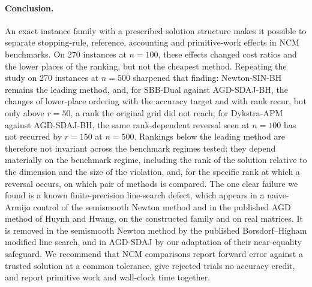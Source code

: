 \paragraph{Conclusion.}
An exact instance family with a prescribed solution structure makes it
possible to separate stopping-rule, reference, accounting and
primitive-work effects in NCM benchmarks. On 270 instances at $n=100$, these
effects changed cost ratios and the lower places of the ranking, but not the
cheapest method. Repeating the study on 270 instances at $n=500$ sharpened
that finding: Newton-SIN-BH remains the leading method, and, for SBB-Dual
against AGD-SDAJ-BH, the changes of
lower-place ordering with the accuracy target and with rank recur, but only
above $r=50$, a rank the original grid did not reach; for Dykstra-APM
against AGD-SDAJ-BH, the same rank-dependent reversal seen at $n=100$ has
not recurred by $r=150$ at $n=500$. Rankings
below the leading method are therefore not invariant across the benchmark
regimes tested; they depend materially on the benchmark
regime, including the
rank of the solution relative to the dimension and the size of the violation, and, for
the specific rank at which a reversal occurs, on which pair of methods is
compared. The one clear failure we found is a known finite-precision
line-search defect, which appears in a naive-Armijo control of the semismooth
Newton method and in the published AGD method of Huynh and Hwang, on
the constructed family and on real matrices. It is
removed in the semismooth Newton method by the published Borsdorf--Higham
modified line search, and in AGD-SDAJ by our adaptation of their near-equality
safeguard. We recommend
that NCM comparisons report forward error against a trusted solution at a
common tolerance, give rejected trials no accuracy credit, and report
primitive work and wall-clock time together.
